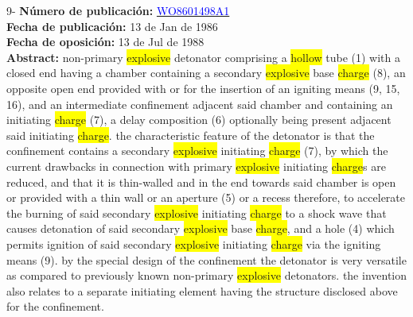  \vspace{1cm}9- \textbf{Número de publicación:} \href{https://worldwide.espacenet.com/publicationDetails/biblio?DB=EPODOC&II=0&ND=3&adjacent=true&locale=en_EP&FT=D&date=20160331&CC=WO&NR=8601498A1&KC=#}{\textcolor{blue}{WO8601498A1}}\\ 
\textbf{Fecha de publicación:} 13 de Jan de 1986\\ 
\textbf{Fecha de oposición:} 13 de Jul de 1988\\ 
\textbf{Abstract:} non-primary \colorbox{yellow}{explosive} detonator comprising a \colorbox{yellow}{\colorbox{yellow}{hollow}} tube (1) with a closed end having a chamber containing a secondary \colorbox{yellow}{explosive} base \colorbox{yellow}{\colorbox{yellow}{charge}} (8), an opposite open end provided with or for the insertion of an igniting means (9, 15, 16), and an intermediate confinement adjacent said chamber and containing an initiating \colorbox{yellow}{\colorbox{yellow}{charge}} (7), a delay composition (6) optionally being present adjacent said initiating \colorbox{yellow}{\colorbox{yellow}{charge}}. the characteristic feature of the detonator is that the confinement contains a secondary \colorbox{yellow}{explosive} initiating \colorbox{yellow}{\colorbox{yellow}{charge}} (7), by which the current drawbacks in connection with primary \colorbox{yellow}{explosive} initiating \colorbox{yellow}{\colorbox{yellow}{charge}}s are reduced, and that it is thin-walled and in the end towards said chamber is open or provided with a thin wall or an aperture (5) or a recess therefore, to accelerate the burning of said secondary \colorbox{yellow}{explosive} initiating \colorbox{yellow}{\colorbox{yellow}{charge}} to a shock wave that causes detonation of said secondary \colorbox{yellow}{explosive} base \colorbox{yellow}{\colorbox{yellow}{charge}}, and a hole (4) which permits ignition of said secondary \colorbox{yellow}{explosive} initiating \colorbox{yellow}{\colorbox{yellow}{charge}} via the igniting means (9). by the special design of the confinement the detonator is very versatile as compared to previously known non-primary \colorbox{yellow}{explosive} detonators. the invention also relates to a separate initiating element having the structure disclosed above for the confinement.\\ 
 

